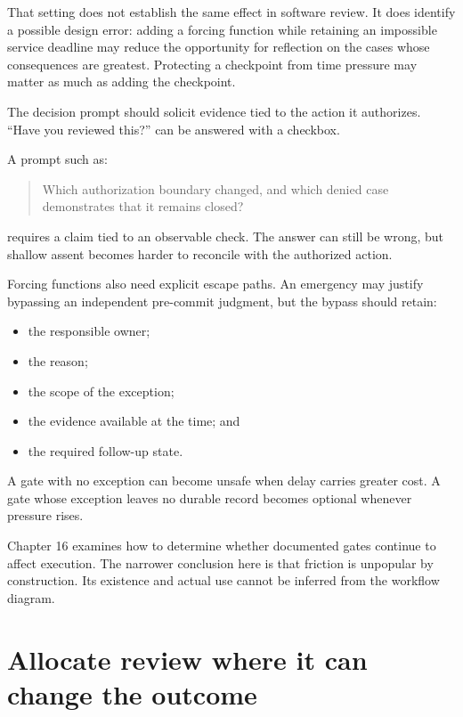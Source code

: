 That setting does not establish the same effect in software review. It does identify a possible design error: adding a forcing function while retaining an impossible service deadline may reduce the opportunity for reflection on the cases whose consequences are greatest. Protecting a checkpoint from time pressure may matter as much as adding the checkpoint.

The decision prompt should solicit evidence tied to the action it authorizes. ``Have you reviewed this?'' can be answered with a checkbox.

A prompt such as:

\begin{quote}
Which authorization boundary changed, and which denied case demonstrates that it remains closed?
\end{quote}

requires a claim tied to an observable check. The answer can still be wrong, but shallow assent becomes harder to reconcile with the authorized action.


Forcing functions also need explicit escape paths. An emergency may justify bypassing an independent pre-commit judgment, but the bypass should retain:

\begin{itemize}
\tightlist
\item
  the responsible owner;
\item
  the reason;
\item
  the scope of the exception;
\item
  the evidence available at the time; and
\item
  the required follow-up state.
\end{itemize}

A gate with no exception can become unsafe when delay carries greater cost. A gate whose exception leaves no durable record becomes optional whenever pressure rises.

Chapter 16 examines how to determine whether documented gates continue to affect execution. The narrower conclusion here is that friction is unpopular by construction. Its existence and actual use cannot be inferred from the workflow diagram.

\hypertarget{allocate-review-where-it-can-change-the-outcome}{%
\section{Allocate review where it can change the outcome}\label{allocate-review-where-it-can-change-the-outcome}}

